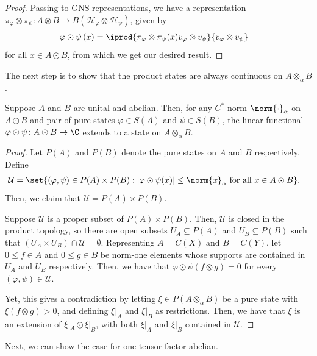 \documentclass[10pt]{mypackage}
\begin{document}
\begin{proof}
  Passing to GNS representations, we have a representation $\pi_{\varphi}\otimes \pi_{\psi}\colon A\otimes B\rightarrow B\left( \mathcal{H}_{\varphi}\otimes \mathcal{H}_{\psi} \right)$, given by
  \begin{align*}
    \varphi\odot\psi\left( x \right) &= \iprod{\pi_{\varphi}\otimes\pi_{\psi}(x) v_{\varphi}\otimes v_{\psi}}{v_{\varphi}\otimes v_{\psi}}
  \end{align*}
  for all $x\in A\odot B$, from which we get our desired result.
\end{proof}
The next step is to show that the product states are always continuous on $A\otimes_{\alpha}B$. 
\begin{lemma}
  Suppose $A$ and $B$ are unital and abelian. Then, for any $C^{\ast}$-norm $\norm{\cdot}_{\alpha}$ on $A\odot B$ and pair of pure states $\varphi\in S(A)$ and $\psi\in S(B)$, the linear functional $\varphi\odot\psi\colon A\odot B\rightarrow \C$ extends to a state on $A\otimes_{\alpha}B$.
\end{lemma}
\begin{proof}
  Let $P(A)$ and $P(B)$ denote the pure states on $A$ and $B$ respectively. Define
  \begin{align*}
    \mathcal{U} &= \set{\left( \varphi,\psi \right)\in P(A)\times P(B) : \left\vert \varphi\odot\psi(x) \right\vert\leq \norm{x}_{\alpha}\text{ for all }x\in A\odot B}.
  \end{align*}
  Then, we claim that $\mathcal{U} = P(A)\times P(B)$.

  Suppose $\mathcal{U}$ is a proper subset of $P(A)\times P(B)$. Then, $\mathcal{U}$ is closed in the product topology, so there are open subsets $U_A\subseteq P(A)$ and $U_B\subseteq P(B)$ such that $\left( U_A\times U_B \right)\cap \mathcal{U} = \emptyset$. Representing $A = C(X)$ and $B = C(Y)$, let $0\leq f\in A$ and $0\leq g\in B$ be norm-one elements whose supports are contained in $U_A$ and $U_B$ respectively. Then, we have that $\varphi\odot\psi\left( f\otimes g \right) = 0$ for every $\left( \varphi,\psi \right)\in \mathcal{U}$.

  Yet, this gives a contradiction by letting $\xi\in P\left( A\otimes_{\alpha}B \right)$ be a pure state with $\xi\left( f\otimes g \right) > 0$, and defining $\xi|_{A}$ and $\xi|_{B}$ as restrictions. Then, we have that $\xi$ is an extension of $\xi|_{A}\odot\xi|_{B}$, with both $\xi|_{A}$ and $\xi|_{B}$ contained in $\mathcal{U}$.
\end{proof}
Next, we can show the case for one tensor factor abelian.
\end{document}
